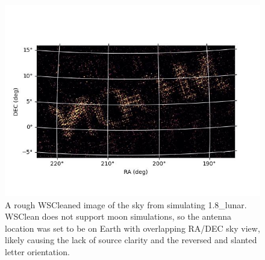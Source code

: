 \documentclass{article}
\begin{document}
\begin{figure}[h!]
    \centering
    \includegraphics[width=0.9\linewidth]{documentation_figures/cleaned_moon.jpg}
    \caption{A rough WSCleaned image of the sky from simulating 1.8\_lunar. WSClean does not support moon simulations, so the antenna location was set to be on Earth with overlapping RA/DEC sky view, likely causing the lack of source clarity and the reversed and slanted letter orientation.}
    \label{fig:moon}
\end{figure}
\end{document}
